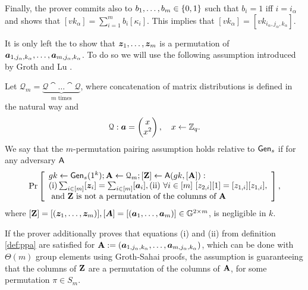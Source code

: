 Finally, the prover commits also to $b_1,\ldots,b_m\in\{0,1\}$ such that $b_i=1$ iff $i=i_\alpha$ and shows that $[vk_\alpha] = \sum_{i=1}^m b_i[\kappa_i]$. This implies that $[vk_\alpha] = [vk_{i_\alpha,j_\alpha,k_\alpha}]$.


It is only left the to show that ${\boldsymbol{z}}_1,\ldots,{\boldsymbol{z}}_m$ is a permutation of ${\boldsymbol{a}}_{1,j_\alpha,k_\alpha},\ldots,{\boldsymbol{a}}_{m,j_\alpha,k_\alpha}$. To do so we will use the following assumption introduced by Groth and Lu \cite{AC:GroLu07}.
\begin{definition}\label{def:ppa}
Let $\mathcal{Q}_{m}=\underbrace{\mathcal{Q}\cat\ldots\cat\mathcal{Q}}_{m\text{ times}}$, where concatenation of matrix distributions is defined in the natural way and 
$$\mathcal{Q}: {\boldsymbol{a}}=\left(\begin{matrix}x\\x^2\end{matrix}\right),\quad x\gets\mathbb{Z}_q.$$
We say that the $m$-permutation pairing assumption holds relative to $\mathsf{Gen}_s$ if for any adversary $\mathsf{A}$
$$
\Pr\left[
\begin{array}{l}
gk\gets\mathsf{Gen}_s(1^k);\mathbf{{A}}\gets\mathcal{Q}_{m};[\mathbf{{Z}}]\gets\mathsf{A}(gk,[\mathbf{{A}}]):\\
\mathrm{(i)} \sum_{i\in[m]}[{\boldsymbol{z}}_i]=\sum_{i\in[m]}[{\boldsymbol{a}}_i], \mathrm{(ii)}\ \forall i\in[m]\ [z_{2,i}][1]=[z_{1,i}][z_{1,i}],\\
\text{ and }\mathbf{{Z}}\text{ is not a permutation of the columns of }\mathbf{{A}}
\end{array}
\right],
$$
where $[\mathbf{{Z}}]=[({\boldsymbol{z}}_1,\ldots,{\boldsymbol{z}}_m)],[{\boldsymbol{A}}]=[({\boldsymbol{a}}_1,\ldots,{\boldsymbol{a}}_m)]\in\mathbb{G}^{2\times m}$,
is negligible in $k$.
\end{definition}

If the prover additionally proves that equations (i) and (ii) from definition \ref{def:ppa} are satisfied for $\mathbf{{A}}:=({\boldsymbol{a}}_{1,j_\alpha,k_\alpha},\ldots,{\boldsymbol{a}}_{m,j_\alpha,k_\alpha})$, which can be done with $\Theta(m)$ group elements using Groth-Sahai proofs, the assumption is guaranteeing that the columns of $\mathbf{{Z}}$ are a permutation of the columns of $\mathbf{{A}}$, for some permutation $\pi\in S_m$.

